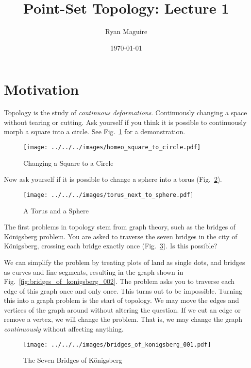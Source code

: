 \documentclass{article}
\title{Point-Set Topology: Lecture 1}
\author{Ryan Maguire}
\date{\today}
\theoremstyle{plain}
\theoremstyle{normal}
\begin{document}
    \maketitle
    \section{Motivation}
        Topology is the study of \textit{continuous deformations}. Continuously
        changing a space without tearing or cutting. Ask yourself if you think
        it is possible to continuously morph a square into a circle.
        See Fig.~\ref{fig:homeo_square_to_circle} for a demonstration.
        \begin{figure}
            \centering
            \texttt{[image: ../../../images/homeo\_square\_to\_circle.pdf]}
            \caption{Changing a Square to a Circle}
            \label{fig:homeo_square_to_circle}
        \end{figure}
        Now ask yourself if it is possible to change a sphere into a torus
        (Fig.~\ref{fig:torus_next_to_sphere}).
        \begin{figure}
            \centering
            \texttt{[image: ../../../images/torus\_next\_to\_sphere.pdf]}
            \caption{A Torus and a Sphere}
            \label{fig:torus_next_to_sphere}
        \end{figure}
        The first problems in topology
        stem from graph theory, such as the bridges of K\"{o}nigsberg
        problem. You are asked to traverse the seven bridges in the city of
        K\"{o}nigsberg, crossing each bridge exactly once
        (Fig.~\ref{fig:bridges_of_konigsberg_001}). Is this possible?
        \par\hfill\par
        We can simplify the problem by treating plots of land as single dots,
        and bridges as curves and line segments, resulting in the graph
        shown in Fig.~\ref{fig:bridges_of_konigsberg_002}. The problem asks you
        to traverse each edge of this graph once and only once. This turns
        out to be impossible. Turning this into a graph problem is the
        start of topology. We may move the edges and vertices of the graph
        around without altering the question. If we cut an edge or remove a
        vertex, we will change the problem. That is, we may change the graph
        \textit{continuously} without affecting anything.
        \begin{figure}
            \centering
            \texttt{[image: ../../../images/bridges\_of\_konigsberg\_001.pdf]}
            \caption{The Seven Bridges of K\"{o}nigsberg}
            \label{fig:bridges_of_konigsberg_001}
        \end{figure}
\end{document}
